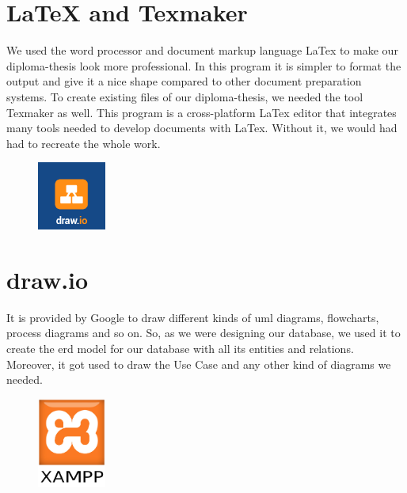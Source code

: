 \section{LaTeX and Texmaker}
We used the word processor and document markup language LaTex to make our diploma-thesis look more professional. In this program it is simpler to format the output and give it a nice shape compared to other document preparation systems. To create existing files of our diploma-thesis, we needed the tool Texmaker as well. This program is a cross-platform LaTex editor that integrates many tools needed to develop documents with LaTex. Without it, we would had had to recreate the whole work.

\begin{figure}
  \begin{center}
    \includegraphics[width=0.2\textwidth] {bilder/Draw_io}
  \end{center}
\end{figure}
\section{draw.io}
It is provided by Google to draw different kinds of \gls{uml} diagrams, flowcharts, process diagrams and so on. So, as we were designing our database, we used it to create the \gls{erd} model for our database with all its entities and relations. Moreover, it got used to draw the Use Case and any other kind of diagrams we needed.

\begin{figure}
  \begin{center}
    \includegraphics[width=0.2\textwidth] {bilder/XAMPP}
  \end{center}
\end{figure}
